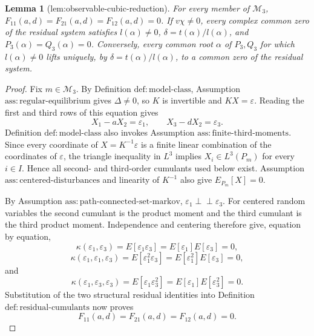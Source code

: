\documentclass{article}
\newtheorem{lemma}{Lemma}
\begin{document}
\begin{lemma}[lem:observable-cubic-reduction]\label{lem:observable-cubic-reduction}
For every member of \(\mathcal M_3\), \(F_{11}(a,d)=F_{21}(a,d)=F_{12}(a,d)=0\). If \(v\chi\neq0\), every complex common zero of the residual system satisfies \(l(\alpha)\neq0\), \(\delta=t(\alpha)/l(\alpha)\), and \(P_3(\alpha)=Q_3(\alpha)=0\). Conversely, every common root \(\alpha\) of \(P_3,Q_3\) for which \(l(\alpha)\neq0\) lifts uniquely, by \(\delta=t(\alpha)/l(\alpha)\), to a common zero of the residual system.
\end{lemma}
\begin{proof}
Fix \(m\in\mathcal M_3\).  By Definition \(\mathrm{def:model\mbox{-}class}\), Assumption \(\mathrm{ass:regular\mbox{-}equilibrium}\) gives \(\Delta\neq0\), so \(K\) is invertible and \(KX=\varepsilon\).  Reading the first and third rows of this equation gives
\[
X_1-aX_2=\varepsilon_1,
\qquad
X_3-dX_2=\varepsilon_3.
\]
Definition \(\mathrm{def:model\mbox{-}class}\) also invokes Assumption \(\mathrm{ass:finite\mbox{-}third\mbox{-}moments}\).  Since every coordinate of \(X=K^{-1}\varepsilon\) is a finite linear combination of the coordinates of \(\varepsilon\), the triangle inequality in \(L^3\) implies \(X_i\in L^3(P_m)\) for every \(i\in I\).  Hence all second- and third-order cumulants used below exist.  Assumption \(\mathrm{ass:centered\mbox{-}disturbances}\) and linearity of \(K^{-1}\) also give \(E_{P_m}[X]=0\).

By Assumption \(\mathrm{ass:path\mbox{-}connected\mbox{-}set\mbox{-}markov}\), \(\varepsilon_1\perp\!\!\!\perp\varepsilon_3\).  For centered random variables the second cumulant is the product moment and the third cumulant is the third product moment.  Independence and centering therefore give, equation by equation,
\[
\kappa(\varepsilon_1,\varepsilon_3)
=E[\varepsilon_1\varepsilon_3]
=E[\varepsilon_1]E[\varepsilon_3]=0,
\]
\[
\kappa(\varepsilon_1,\varepsilon_1,\varepsilon_3)
=E[\varepsilon_1^2\varepsilon_3]
=E[\varepsilon_1^2]E[\varepsilon_3]=0,
\]
and
\[
\kappa(\varepsilon_1,\varepsilon_3,\varepsilon_3)
=E[\varepsilon_1\varepsilon_3^2]
=E[\varepsilon_1]E[\varepsilon_3^2]=0.
\]
Substitution of the two structural residual identities into Definition \(\mathrm{def:residual\mbox{-}cumulants}\) now proves
\[
F_{11}(a,d)=F_{21}(a,d)=F_{12}(a,d)=0.
\]


\end{proof}
\end{document}
